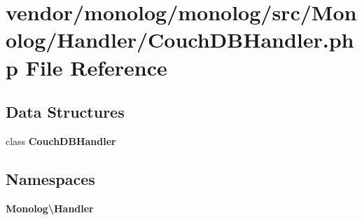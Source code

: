 \section{vendor/monolog/monolog/src/\+Monolog/\+Handler/\+Couch\+D\+B\+Handler.php File Reference}
\label{_couch_d_b_handler_8php}
\subsection*{Data Structures}
\begin{DoxyCompactItemize}
\item 
class {\bf Couch\+D\+B\+Handler}
\end{DoxyCompactItemize}
\subsection*{Namespaces}
\begin{DoxyCompactItemize}
\item 
 {\bf Monolog\textbackslash{}\+Handler}
\end{DoxyCompactItemize}
